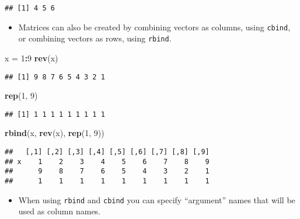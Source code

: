 \documentclass[]{book}
\newenvironment{Shaded}{\begin{snugshade}}{\end{snugshade}}
\newcommand{\DecValTok}[1]{\textcolor[rgb]{0.00,0.00,0.81}{#1}}
\newcommand{\KeywordTok}[1]{\textcolor[rgb]{0.13,0.29,0.53}{\textbf{#1}}}
\newcommand{\NormalTok}[1]{#1}
\newcommand{\OperatorTok}[1]{\textcolor[rgb]{0.81,0.36,0.00}{\textbf{#1}}}
\newcommand{\StringTok}[1]{\textcolor[rgb]{0.31,0.60,0.02}{#1}}
\providecommand{\tightlist}{%
  \setlength{\itemsep}{0pt}\setlength{\parskip}{0pt}}
\begin{document}
\begin{verbatim}
## [1] 4 5 6
\end{verbatim}

\begin{itemize}
\tightlist
\item
  Matrices can also be created by combining vectors as columns, using \texttt{cbind}, or combining vectors as rows, using \texttt{rbind}.
\end{itemize}

\begin{Shaded}
\begin{Highlighting}[]
\NormalTok{x =}\StringTok{ }\DecValTok{1}\OperatorTok{:}\DecValTok{9}
\KeywordTok{rev}\NormalTok{(x)}
\end{Highlighting}
\end{Shaded}

\begin{verbatim}
## [1] 9 8 7 6 5 4 3 2 1
\end{verbatim}

\begin{Shaded}
\begin{Highlighting}[]
\KeywordTok{rep}\NormalTok{(}\DecValTok{1}\NormalTok{, }\DecValTok{9}\NormalTok{)}
\end{Highlighting}
\end{Shaded}

\begin{verbatim}
## [1] 1 1 1 1 1 1 1 1 1
\end{verbatim}

\begin{Shaded}
\begin{Highlighting}[]
\KeywordTok{rbind}\NormalTok{(x, }\KeywordTok{rev}\NormalTok{(x), }\KeywordTok{rep}\NormalTok{(}\DecValTok{1}\NormalTok{, }\DecValTok{9}\NormalTok{))}
\end{Highlighting}
\end{Shaded}

\begin{verbatim}
##   [,1] [,2] [,3] [,4] [,5] [,6] [,7] [,8] [,9]
## x    1    2    3    4    5    6    7    8    9
##      9    8    7    6    5    4    3    2    1
##      1    1    1    1    1    1    1    1    1
\end{verbatim}

\begin{itemize}
\tightlist
\item
  When using \texttt{rbind} and \texttt{cbind} you can specify ``argument'' names that will be used as column names.
\end{itemize}
\end{document}
